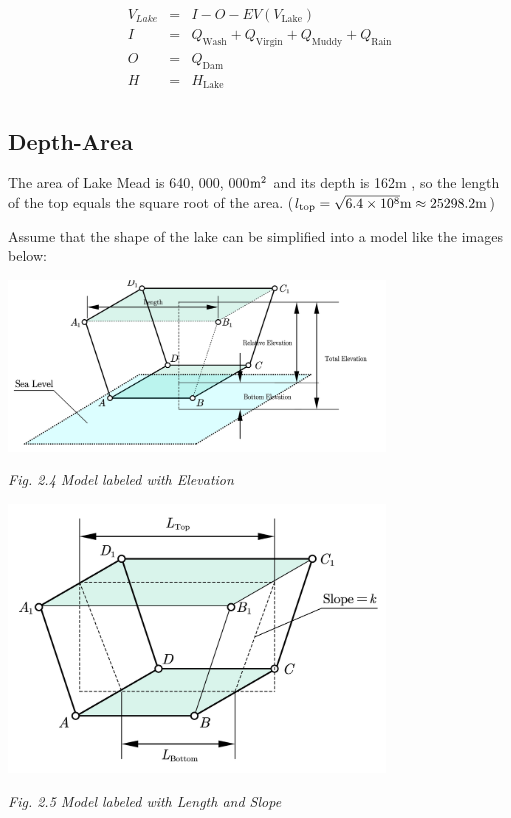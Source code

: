 \documentclass[12pt]{article}
\theoremstyle{definition}
\theoremstyle{remark}
\numberwithin{equation}{section}
\begin{document}
		$$\begin{array}{rcl}
			V_{Lake}&=&I-O-EV(V_{\text{Lake}})\\
			I&=&Q_{\text{Wash}}+Q_{\text{Virgin}}+Q_{\text{Muddy}}+Q_{\text{Rain}}\\
			O&=&Q_{\text{Dam}}\\
			H&=&H_{\text{Lake}}\\
		\end{array}$$
		\subsection{Depth-Area}

	The area of Lake Mead is 640, 000, 000$\rm{m}^2$ and its depth is 162$\text{m}$ \cite{Lake Mead}, so the length of the top equals the square root of the area. ($l_{\text{top}}=\sqrt{6.4\times{10^8}} \rm{m}\approx25298.2\rm{m}$)

	Assume that the shape of the lake can be simplified into a model like the images below:
	
	\begin{center}
		\includegraphics[width=10cm]{2.4 Model labeled with Elevation.jpg}
		
		\small\textit{Fig. 2.4 Model labeled with Elevation}
		
		
		\includegraphics[width=10cm]{2.5 Model labeled with Length and Slope.jpg}
		
		\small\textit{Fig. 2.5 Model labeled with Length and Slope}
	\end{center}
\end{document}
